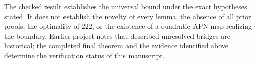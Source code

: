 The checked result establishes the universal bound under the exact hypotheses stated. It does not establish the novelty of every lemma, the absence of all prior proofs, the optimality of $222$, or the existence of a quadratic APN map realizing the boundary. Earlier project notes that described unresolved bridges are historical; the completed final theorem and the evidence identified above determine the verification status of this manuscript.
